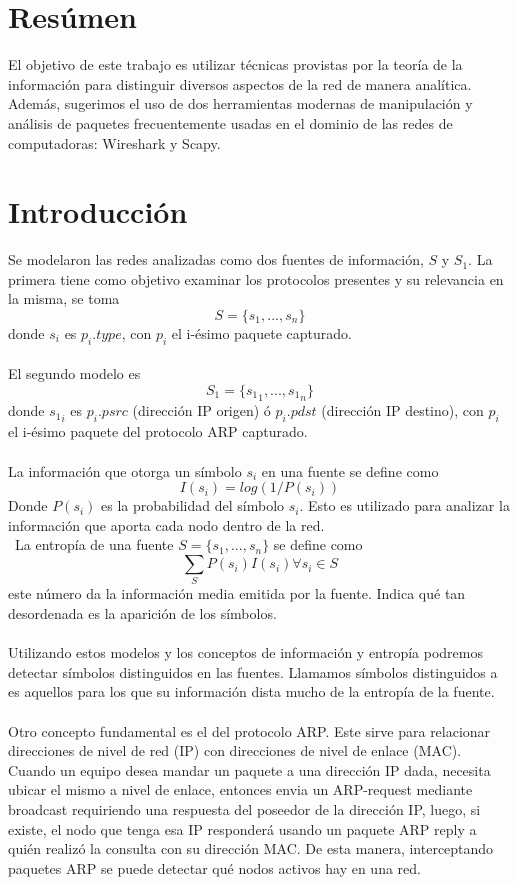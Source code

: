 \section{Resúmen}

El objetivo de este trabajo es utilizar técnicas provistas por la teoría de la información para distinguir diversos aspectos de la red de manera analítica. Además, sugerimos el uso de dos herramientas modernas de manipulación y análisis de paquetes frecuentemente usadas en el dominio de las redes de computadoras: Wireshark y Scapy.

\section{Introducción}
Se modelaron las redes analizadas como dos fuentes de información, $S$ y $S_1$. La primera tiene como objetivo examinar los protocolos presentes y su relevancia en la misma, se toma
						$$S = \{s_1,...,s_n\}$$
donde $s_i$ es $p_i.type$, con $p_i$ el i-ésimo paquete capturado.
\\\\
El segundo modelo es 
						$$S_1 = \{{s_1}_1,...,{s_1}_n\}$$
donde ${s_1}_i$ es $p_i.psrc$ (dirección IP origen) ó $p_i.pdst$ (dirección IP destino), con $p_i$ el i-ésimo paquete del protocolo ARP capturado.
\\\\
La información que otorga un símbolo $s_i$ en una fuente se define como
								$$ I (s_i) = log(1/P(s_i)) $$
Donde $P(s_i)$ es la probabilidad del símbolo $s_i$. Esto es utilizado para analizar la información que aporta cada nodo dentro de la red.
\\\
La entropía de una fuente $S = \{s_1,...,s_n\}$ se define como
								$$\sum_{S} P(s_i)I(s_i) \forall{s_i} \in{S}$$
este número da la información media emitida por la fuente. Indica qué tan desordenada es la aparición de los símbolos.
\\\\
Utilizando estos modelos y los conceptos de información y entropía podremos detectar símbolos distinguidos en las fuentes. Llamamos símbolos distinguidos a es aquellos para los que su información dista mucho de la entropía de la fuente.
\\\\
Otro concepto fundamental es el del protocolo ARP. Este sirve para relacionar direcciones de nivel de red (IP) con direcciones de nivel de enlace (MAC). Cuando un equipo desea mandar un paquete a una dirección IP dada, necesita ubicar el mismo a nivel de enlace, entonces envia un ARP-request mediante broadcast requiriendo una respuesta del poseedor de la dirección IP, luego, si existe, el nodo que tenga esa IP responderá usando un paquete ARP reply a quién realizó la consulta con su dirección MAC. De esta manera, interceptando paquetes ARP se puede detectar qué nodos activos hay en una red.		
